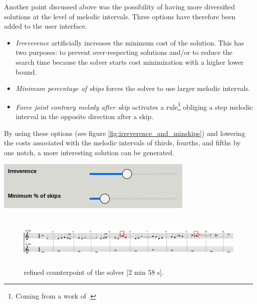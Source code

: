 Another point discussed above was the possibility of having more diversified solutions at the level of melodic intervals. Three options have therefore been added to the user interface.
\begin{itemize}
    \item \textit{Irreverence} artificially increases the minimum cost of the solution. This has two purposes: to prevent over-respecting solutions and/or to reduce the search time because the solver starts cost minimization with a higher lower bound.
    \item \textit{Minimum percentage of skips} forces the solver to use larger melodic intervals.
    \item \textit{Force joint contrary melody after skip} activates a rule\footnote{Coming from a work of \textcite{Bitsch}.} obliging a step melodic interval in the opposite direction after a skip.
\end{itemize}

\begin{multicols}{2}
    By using these options (see figure \ref{fig:irreverence_and_minskips}) and lowering the costs associated with the melodic intervals of thirds, fourths, and fifths by one notch, a more interesting solution can be generated.
    \begin{Figure}
        \centering
        \includegraphics[scale=0.4]{Images/5sp_irreverence_and_minskips.png}
        \label{fig:irreverence_and_minskips}
    \end{Figure}
\end{multicols}

\begin{figure}[h]
    \centering
    \includegraphics[width=\textwidth, height=1in]{Images/solver_5sp_bb.png}
    \caption{ refined counterpoint of the solver [2 min 58 s].}
    \label{fig:solver_5sp_better}
\end{figure}

